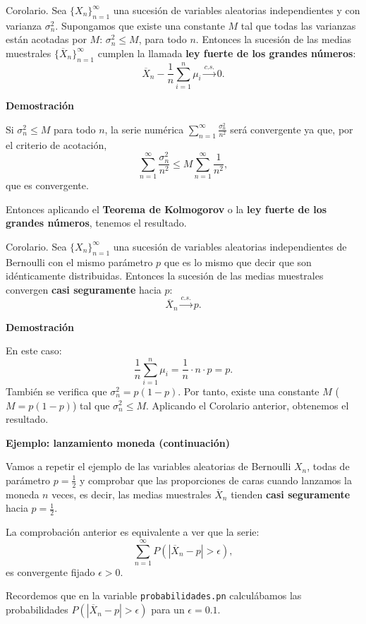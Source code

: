 \documentclass[
  letterpaper,
  DIV=11,
  numbers=noendperiod]{scrreprt}
\begin{document}
Corolario. Sea \(\{X_n\}_{n=1}^\infty\) una sucesión de variables
aleatorias independientes y con varianza \(\sigma_n^2\). Supongamos que
existe una constante \(M\) tal que todas las varianzas están acotadas
por \(M\): \(\sigma_n^2\leq M\), para todo \(n\). Entonces la sucesión
de las medias muestrales \(\{\overline{X}_n\}_{n=1}^\infty\) cumplen la
llamada \textbf{ley fuerte de los grandes números}: \[
\overline{X}_n-\frac{1}{n}\sum_{i=1}^n \mu_i \stackrel{c.s.}{\longrightarrow} 0.
\]

\textbf{Demostración}

Si \(\sigma_n^2\leq M\) para todo \(n\), la serie numérica
\(\sum\limits_{n=1}^\infty \frac{\sigma_n^2}{n^2}\) será convergente ya
que, por el criterio de acotación, \[
\sum\limits_{n=1}^\infty \frac{\sigma_n^2}{n^2}\leq M\sum\limits_{n=1}^\infty \frac{1}{n^2},
\] que es convergente.

Entonces aplicando el \textbf{Teorema de Kolmogorov} o la \textbf{ley
fuerte de los grandes números}, tenemos el resultado.

Corolario. Sea \(\{X_n\}_{n=1}^\infty\) una sucesión de variables
aleatorias independientes de Bernoulli con el mismo parámetro \(p\) que
es lo mismo que decir que son idénticamente distribuidas. Entonces la
sucesión de las medias muestrales convergen \textbf{casi seguramente}
hacia \(p\): \[
\overline{X}_n \stackrel{c.s.}{\longrightarrow} p.
\]

\textbf{Demostración}

En este caso: \[
\frac{1}{n}\sum_{i=1}^n \mu_i = \frac{1}{n}\cdot n\cdot p=p.
\] También se verifica que \(\sigma_n^2 =p(1-p)\). Por tanto, existe una
constante \(M\) (\(M=p(1-p)\)) tal que \(\sigma_n^2\leq M\). Aplicando
el Corolario anterior, obtenemos el resultado.

\textbf{Ejemplo: lanzamiento moneda (continuación)}

Vamos a repetir el ejemplo de las variables aleatorias de Bernoulli
\(X_n\), todas de parámetro \(p=\frac{1}{2}\) y comprobar que las
proporciones de caras cuando lanzamos la moneda \(n\) veces, es decir,
las medias muestrales \(\overline{X}_n\) tienden \textbf{casi
seguramente} hacia \(p=\frac{1}{2}\).

La comprobación anterior es equivalente a ver que la serie: \[
\sum_{n=1}^\infty P(|\overline{X}_n-p|>\epsilon),
\] es convergente fijado \(\epsilon >0\).

Recordemos que en la variable \texttt{probabilidades.pn} calculábamos
las probabilidades \(P(|\overline{X}_n-p|>\epsilon)\) para un
\(\epsilon =0.1\).
\end{document}
